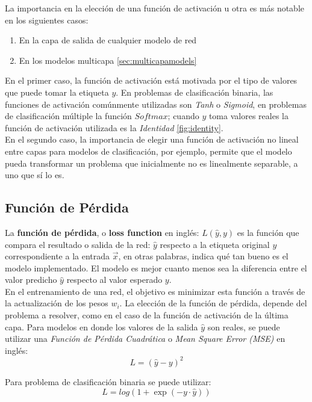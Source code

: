 La importancia en la elección de una función de activación u otra es más notable en los siguientes casos:
\begin{enumerate}
\item En la capa de salida de cualquier modelo de red
\item En los modelos multicapa \autoref{sec:multicapamodels}
\end{enumerate}
En el primer caso, la función de activación está motivada por el tipo de valores que puede tomar la etiqueta $y$. En problemas de clasificación binaria, las funciones de activación comúnmente utilizadas son \emph{Tanh} o \emph{Sigmoid}, en problemas de clasificación múltiple la función $Softmax$; cuando $y$ toma valores reales la función de activación utilizada es la \emph{Identidad} \autoref{fig:identity}.
\\
En el segundo caso, la importancia de elegir una función de activación no lineal entre capas para modelos de clasificación, por ejemplo, permite que el modelo pueda transformar un problema que inicialmente no es linealmente separable, a uno que sí lo es.


\subsection{Función de Pérdida}
La \textbf{función de pérdida}, o \textbf{loss function} en inglés: $L(\hat{y},y)$ es la función que compara el resultado o salida de la red: $\hat{y}$ respecto a la etiqueta original $y$ correspondiente a la entrada $\vec{x}$, en otras palabras, indica qué tan bueno es el modelo implementado. El modelo es mejor cuanto menos sea la diferencia entre el valor predicho $\hat{y}$ respecto al valor esperado $y$.
\\
En el entrenamiento de una red, el objetivo es minimizar esta función a través de la actualización de los pesos $w_i$. La elección de la función de pérdida, depende del problema a resolver, como en el caso de la función de activación de la última capa. Para modelos en donde los valores de la salida $\hat{y}$ son reales, se puede utilizar una \emph{Función de Pérdida Cuadrática} o \emph{Mean Square Error (MSE)} en inglés:
\begin{equation}
  \label{eq:MSE}
  L = (\hat{y}-y)^2
\end{equation}

Para problema de clasificación binaria se puede utilizar:
\begin{equation}
  \label{eq:bin}
  L = log(1 + \exp(−y\cdot \hat{y}))
\end{equation}

